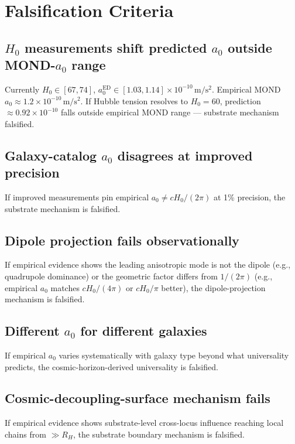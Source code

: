 \documentclass[11pt,a4paper]{article}
\begin{document}
\section{Falsification Criteria}

\subsection{$H_0$ measurements shift predicted $a_0$ outside MOND-$a_0$ range}

Currently $H_0 \in [67, 74]$, $a_0^\mathrm{ED} \in [1.03, 1.14] \times 10^{-10}\,\mathrm{m/s^2}$. Empirical MOND $a_0 \approx 1.2 \times 10^{-10}\,\mathrm{m/s^2}$. If Hubble tension resolves to $H_0 = 60$, prediction $\approx 0.92 \times 10^{-10}$ falls outside empirical MOND range --- substrate mechanism falsified.

\subsection{Galaxy-catalog $a_0$ disagrees at improved precision}

If improved measurements pin empirical $a_0 \neq cH_0/(2\pi)$ at 1\% precision, the substrate mechanism is falsified.

\subsection{Dipole projection fails observationally}

If empirical evidence shows the leading anisotropic mode is not the dipole (e.g., quadrupole dominance) or the geometric factor differs from $1/(2\pi)$ (e.g., empirical $a_0$ matches $cH_0/(4\pi)$ or $cH_0/\pi$ better), the dipole-projection mechanism is falsified.

\subsection{Different $a_0$ for different galaxies}

If empirical $a_0$ varies systematically with galaxy type beyond what universality predicts, the cosmic-horizon-derived universality is falsified.

\subsection{Cosmic-decoupling-surface mechanism fails}

If empirical evidence shows substrate-level cross-locus influence reaching local chains from $\gg R_H$, the substrate boundary mechanism is falsified.
\end{document}
